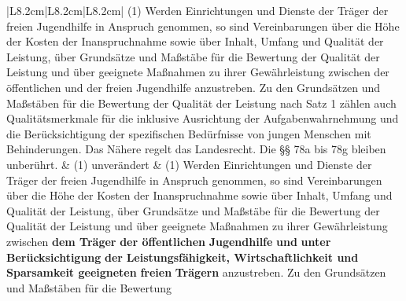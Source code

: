 \documentclass[10pt,a4paper,landscape]{article}
\begin{document}
\begin{longtable}{|L{8.2cm}|L{8.2cm}|L{8.2cm}|}
(1) Werden Einrichtungen und Dienste der  \newline Träger der freien Jugendhilfe in Anspruch  \newline genommen, so sind Vereinbarungen über  \newline die Höhe der Kosten der Inanspruchnahme  \newline sowie über Inhalt, Umfang und Qualität der  \newline Leistung, über Grundsätze und Maßstäbe  \newline für die Bewertung der Qualität der Leistung  \newline und über geeignete Maßnahmen zu ihrer  \newline Gewährleistung zwischen der öffentlichen  \newline und der freien \textcolor{diffred}{Jugendhilfe} anzustreben. Zu  \newline den Grundsätzen und Maßstäben für die  \newline Bewertung der Qualität der Leistung nach  \newline Satz 1 zählen auch Qualitätsmerkmale für  \newline die inklusive Ausrichtung der  \newline Aufgabenwahrnehmung und die  \newline Berücksichtigung der spezifischen  \newline Bedürfnisse von jungen Menschen mit  \newline Behinderungen. Das Nähere regelt das  \newline Landesrecht. Die \S{}\S{} 78a bis 78g bleiben  \newline unberührt. & (1) unverändert & (1) Werden Einrichtungen und Dienste der  \newline Träger der freien Jugendhilfe in Anspruch  \newline genommen, so sind Vereinbarungen über  \newline die Höhe der Kosten der Inanspruchnahme  \newline sowie über Inhalt, Umfang und Qualität der  \newline Leistung, über Grundsätze und Maßstäbe  \newline für die Bewertung der Qualität der Leistung  \newline und über geeignete Maßnahmen zu ihrer  \newline Gewährleistung zwischen \textbf{\textcolor{diffgreen}{dem Träger}}\textbf{ der  \newline öffentlichen }\textbf{\textcolor{diffgreen}{Jugendhilfe}}\textbf{ und }\textbf{\textcolor{diffgreen}{unter  \newline Berücksichtigung}}\textbf{ der} \newline \textbf{\textcolor{diffgreen}{Leistungsfähigkeit, Wirtschaftlichkeit  \newline und Sparsamkeit geeigneten}}\textbf{ freien} \newline \textbf{\textcolor{diffgreen}{Trägern}} anzustreben. Zu den Grundsätzen  \newline und Maßstäben für die Bewertung 
\end{longtable}
\end{document}

